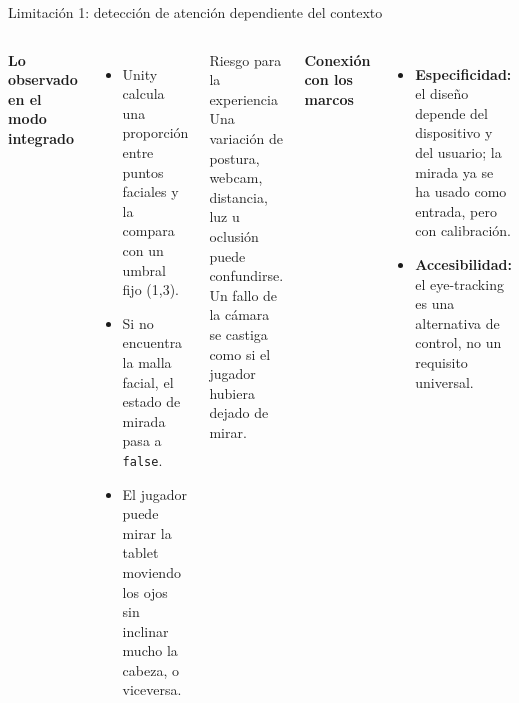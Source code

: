 \documentclass[aspectratio=169,11pt]{beamer}
\newcommand{\tagline}[1]{{\color{Teal}\bfseries\small #1}}
\newcommand{\strong}[1]{{\color{Navy}\bfseries #1}}
\begin{document}
\begin{frame}{Limitación 1: detección de atención dependiente del contexto}
  \begin{columns}[T,onlytextwidth]
      \tagline{Lo observado en el modo integrado}
      \begin{itemize}
        \item Unity calcula una proporción entre puntos faciales y la compara con un umbral fijo (1,3).
        \item Si no encuentra la malla facial, el estado de mirada pasa a \texttt{false}.
        \item El jugador puede mirar la tablet moviendo los ojos sin inclinar mucho la cabeza, o viceversa.
      \end{itemize}
      \begin{block}{Riesgo para la experiencia}
        Una variación de postura, webcam, distancia, luz u oclusión puede confundirse. Un fallo de la cámara se castiga como si el jugador hubiera dejado de mirar.
      \end{block}
      \tagline{Conexión con los marcos}
      \begin{itemize}
        \item \strong{Especificidad:} el diseño depende del dispositivo y del usuario; la mirada ya se ha usado como entrada, pero con calibración.
        \item \strong{Accesibilidad:} el eye-tracking es una alternativa de control, no un requisito universal.
      \end{itemize}
  \end{columns}
\end{frame}
\end{document}
